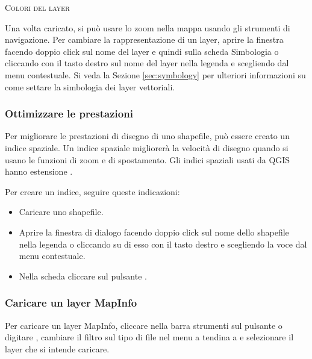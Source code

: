 \begin{Tip}\caption{\textsc{Colori del layer}}
\end{Tip}

Una volta caricato, si può usare lo zoom nella mappa usando gli strumenti di navigazione.
Per cambiare la rappresentazione di un layer, aprire la finestra
 facendo doppio click sul nome del layer e quindi sulla
scheda Simbologia o cliccando con il
tasto destro sul nome del layer nella legenda e scegliendo
 dal menu contestuale. Si veda la Sezione
\ref{sec:symbology} per ulteriori informazioni su come settare la simbologia
dei layer vettoriali.

\subsubsection{Ottimizzare le prestazioni}

Per migliorare le prestazioni di disegno di uno shapefile, può essere creato
un indice spaziale. Un  indice spaziale
migliorerà la velocità di disegno quando si usano le funzioni di zoom e di
spostamento. Gli indici spaziali usati da QGIS hanno estensione .

Per creare un indice, seguire queste indicazioni:

\begin{itemize}
\item Caricare uno shapefile.
\item Aprire la finestra di dialogo  facendo doppio click
sul nome dello shapefile nella legenda o cliccando su di esso con il tasto
destro e scegliendo la voce  dal menu contestuale.
\item Nella scheda  cliccare sul pulsante .
\end{itemize}

\subsubsection{Caricare un layer MapInfo}

Per caricare un layer MapInfo, cliccare nella barra strumenti sul pulsante
 o digitare
, cambiare il filtro sul tipo di file nel menu a tendina a
 e
selezionare il layer che si intende caricare.


